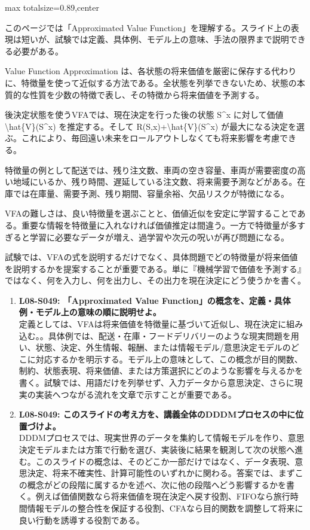 \begin{minipage}[t]{0.58\textwidth}
\begin{adjustbox}{max totalsize={\textwidth}{0.89\textheight},center}
\begin{minipage}{\textwidth}\scriptsize
{}このページでは「Approximated Value Function」を理解する。スライド上の表現は短いが、試験では定義、具体例、モデル上の意味、手法の限界まで説明できる必要がある。\par
Value Function Approximation は、各状態の将来価値を厳密に保存する代わりに、特徴量を使って近似する方法である。全状態を列挙できないため、状態の本質的な性質を少数の特徴で表し、その特徴から将来価値を予測する。\par
後決定状態を使うVFAでは、現在決定を行った後の状態 S\textasciicircum{}x に対して価値 \textbackslash{}hat\{V\}(S\textasciicircum{}x) を推定する。そして R(S,x)+\textbackslash{}hat\{V\}(S\textasciicircum{}x) が最大になる決定を選ぶ。これにより、毎回遠い未来をロールアウトしなくても将来影響を考慮できる。\par
特徴量の例として配送では、残り注文数、車両の空き容量、車両が需要密度の高い地域にいるか、残り時間、遅延している注文数、将来需要予測などがある。在庫では在庫量、需要予測、残り期間、容量余裕、欠品リスクが特徴になる。\par
VFAの難しさは、良い特徴量を選ぶことと、価値近似を安定に学習することである。重要な情報を特徴量に入れなければ価値推定は間違う。一方で特徴量が多すぎると学習に必要なデータが増え、過学習や次元の呪いが再び問題になる。\par
試験では、VFAの式を説明するだけでなく、具体問題でどの特徴量が将来価値を説明するかを提案することが重要である。単に『機械学習で価値を予測する』ではなく、何を入力し、何を出力し、その出力を現在決定にどう使うかを書く。\par{}\begin{enumerate}\item \textbf{L08-S049: 「Approximated Value Function」の概念を、定義・具体例・モデル上の意味の順に説明せよ。}\\定義としては、VFAは将来価値を特徴量に基づいて近似し、現在決定に組み込む。。具体例では、配送・在庫・フードデリバリーのような現実問題を用い、状態、決定、外生情報、報酬、または情報モデル/意思決定モデルのどこに対応するかを明示する。モデル上の意味として、この概念が目的関数、制約、状態表現、将来価値、または方策選択にどのような影響を与えるかを書く。試験では、用語だけを列挙せず、入力データから意思決定、さらに現実の実装へつながる流れを文章で示すことが重要である。\item \textbf{L08-S049: このスライドの考え方を、講義全体のDDDMプロセスの中に位置づけよ。}\\DDDMプロセスでは、現実世界のデータを集約して情報モデルを作り、意思決定モデルまたは方策で行動を選び、実装後に結果を観測して次の状態へ進む。このスライドの概念は、そのどこか一部だけではなく、データ表現、意思決定、将来不確実性、計算可能性のいずれかに関わる。答案では、まずこの概念がどの段階に属するかを述べ、次に他の段階へどう影響するかを書く。例えば価値関数なら将来価値を現在決定へ戻す役割、FIFOなら旅行時間情報モデルの整合性を保証する役割、CFAなら目的関数を調整して将来に良い行動を誘導する役割である。\end{enumerate}

\end{minipage}
\end{adjustbox}
\end{minipage}
